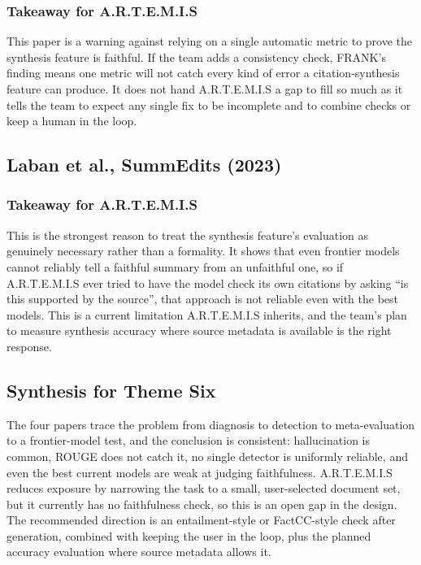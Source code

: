 \documentclass[11pt,a4paper]{report}
\newcommand{\artemis}{A.R.T.E.M.I.S}
\begin{document}
\subsubsection{Takeaway for \artemis{}}

This paper is a warning against relying on a single automatic metric to
prove the synthesis feature is faithful. If the team adds a consistency
check, FRANK's finding means one metric will not catch every kind of
error a citation-synthesis feature can produce. It does not hand
\artemis{} a gap to fill so much as it tells the team to expect any
single fix to be incomplete and to combine checks or keep a human in
the loop.

\subsection{Laban et al., SummEdits (2023)}

\subsubsection{Takeaway for \artemis{}}

This is the strongest reason to treat the synthesis feature's evaluation
as genuinely necessary rather than a formality. It shows that even
frontier models cannot reliably tell a faithful summary from an
unfaithful one, so if \artemis{} ever tried to have the model check its
own citations by asking \enquote{is this supported by the source}, that
approach is not reliable even with the best models. This is a current
limitation \artemis{} inherits, and the team's plan to measure synthesis
accuracy where source metadata is available is the right response.

\subsection{Synthesis for Theme Six}

The four papers trace the problem from diagnosis to detection to
meta-evaluation to a frontier-model test, and the conclusion is
consistent: hallucination is common, ROUGE does not catch it, no single
detector is uniformly reliable, and even the best current models are
weak at judging faithfulness. \artemis{} reduces exposure by narrowing
the task to a small, user-selected document set, but it currently has no
faithfulness check, so this is an open gap in the design. The
recommended direction is an entailment-style or FactCC-style check after
generation, combined with keeping the user in the loop, plus the planned
accuracy evaluation where source metadata allows it.
\end{document}
